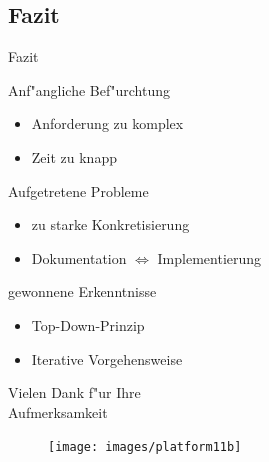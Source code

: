 \subsection{Fazit}
\begin{frame}[<+->]{Fazit}
\begin{block}{Anf"angliche Bef"urchtung}
\begin{itemize}
\item{Anforderung zu komplex}
\item{Zeit zu knapp}
\end{itemize}
\end{block}
\begin{block}{Aufgetretene Probleme}
\begin{itemize}
\item{zu starke Konkretisierung}
\item{Dokumentation $\Leftrightarrow$ Implementierung}
\end{itemize}
\end{block}
\begin{block}{gewonnene Erkenntnisse}
\begin{itemize}
\item{Top-Down-Prinzip}
\item{Iterative Vorgehensweise}
\end{itemize}
\end{block}
\end{frame}

\begin{frame}{}
\begin{center}
\huge{Vielen Dank f"ur Ihre\\Aufmerksamkeit}\\
\begin{figure}[b!]
\texttt{[image: images/platform11b]}
\end{figure}
\end{center}
\end{frame}



